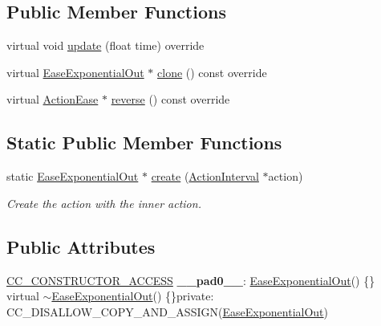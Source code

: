 \subsection*{Public Member Functions}
\begin{DoxyCompactItemize}
\item 
virtual void \hyperlink{classEaseExponentialOut_acbd15c86c12116c3482640a3f8f83d5f}{update} (float time) override
\item 
virtual \hyperlink{classEaseExponentialOut}{Ease\+Exponential\+Out} $\ast$ \hyperlink{classEaseExponentialOut_a484d36a99d2847cfa4f273d5ec73c209}{clone} () const override
\item 
virtual \hyperlink{classActionEase}{Action\+Ease} $\ast$ \hyperlink{classEaseExponentialOut_a99fbc2a18b0b61cfbb2a17414eb9119f}{reverse} () const override
\end{DoxyCompactItemize}
\subsection*{Static Public Member Functions}
\begin{DoxyCompactItemize}
\item 
static \hyperlink{classEaseExponentialOut}{Ease\+Exponential\+Out} $\ast$ \hyperlink{classEaseExponentialOut_a358bb7b34b26a9424269912dff8e311b}{create} (\hyperlink{classActionInterval}{Action\+Interval} $\ast$action)
\begin{DoxyCompactList}\small\item\em Create the action with the inner action. \end{DoxyCompactList}\end{DoxyCompactItemize}
\subsection*{Public Attributes}
\begin{DoxyCompactItemize}
\item 
\mbox{\label{classEaseExponentialOut_afeb84538d1d0fcaa9551481de656d2ff}} 
\hyperlink{_2cocos2d_2cocos_2base_2ccConfig_8h_a25ef1314f97c35a2ed3d029b0ead6da0}{C\+C\+\_\+\+C\+O\+N\+S\+T\+R\+U\+C\+T\+O\+R\+\_\+\+A\+C\+C\+E\+SS} {\bfseries \+\_\+\+\_\+pad0\+\_\+\+\_\+}\+: \hyperlink{classEaseExponentialOut}{Ease\+Exponential\+Out}() \{\} virtual $\sim$\hyperlink{classEaseExponentialOut}{Ease\+Exponential\+Out}() \{\}private\+: C\+C\+\_\+\+D\+I\+S\+A\+L\+L\+O\+W\+\_\+\+C\+O\+P\+Y\+\_\+\+A\+N\+D\+\_\+\+A\+S\+S\+I\+GN(\hyperlink{classEaseExponentialOut}{Ease\+Exponential\+Out})
\end{DoxyCompactItemize}
